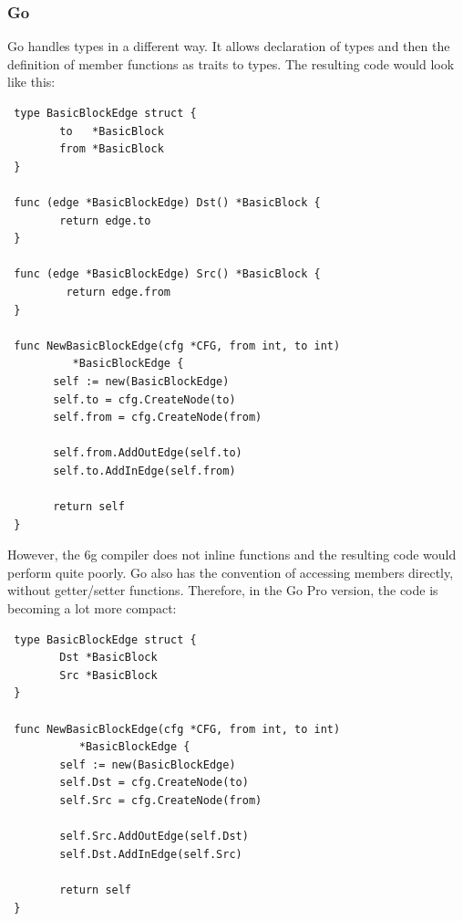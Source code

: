 \subsubsection{Go}

Go handles types in a different way. It allows declaration of types
and then the definition of member functions as traits to types. The
resulting code would look like this:

\begin{footnotesize}
\begin{verbatim}
 type BasicBlockEdge struct {
        to   *BasicBlock
        from *BasicBlock
 }

 func (edge *BasicBlockEdge) Dst() *BasicBlock {
        return edge.to
 }

 func (edge *BasicBlockEdge) Src() *BasicBlock {
         return edge.from
 }

 func NewBasicBlockEdge(cfg *CFG, from int, to int)
          *BasicBlockEdge {
       self := new(BasicBlockEdge)
       self.to = cfg.CreateNode(to)
       self.from = cfg.CreateNode(from)

       self.from.AddOutEdge(self.to)
       self.to.AddInEdge(self.from)

       return self
 }
\end{verbatim}
\end{footnotesize}

However, the 6g compiler does not inline functions and the resulting
code would perform quite poorly. Go also has the convention of
accessing members directly, without getter/setter
functions. Therefore, in the Go Pro version, the code is becoming a
lot more compact:

\begin{footnotesize}
\begin{verbatim}
 type BasicBlockEdge struct {
        Dst *BasicBlock
        Src *BasicBlock
 }
 
 func NewBasicBlockEdge(cfg *CFG, from int, to int) 
           *BasicBlockEdge {
        self := new(BasicBlockEdge)
        self.Dst = cfg.CreateNode(to)
        self.Src = cfg.CreateNode(from)

        self.Src.AddOutEdge(self.Dst)
        self.Dst.AddInEdge(self.Src)
 
        return self
 }
\end{verbatim}
\end{footnotesize}
